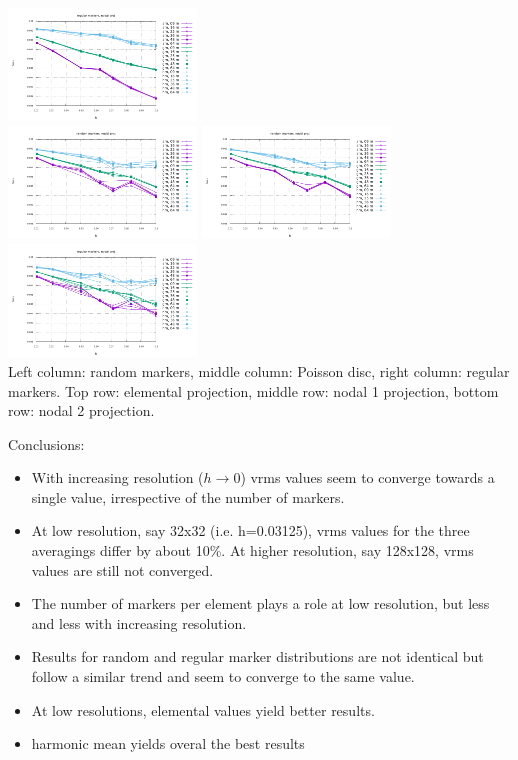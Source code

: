 \begin{center}
\includegraphics[width=5cm]{python_codes/fieldstone_13/vrms_reg_proj2}\\ 
\includegraphics[width=5cm]{python_codes/fieldstone_13/vrms_rand_proj3} 
\includegraphics[width=5cm]{python_codes/fieldstone_13/vrms_poissondisc_proj3} 
\includegraphics[width=5cm]{python_codes/fieldstone_13/vrms_reg_proj3}\\
{\small Left column: random markers, middle column: Poisson disc, right column: regular markers.
Top row: elemental projection, middle row: nodal 1 projection, bottom row: nodal 2 projection. }
\end{center}

Conclusions:
\begin{itemize}
\item
With increasing resolution ($h\rightarrow 0$) vrms values seem to converge towards a single value, irrespective 
of the number of markers. 

\item
At low resolution, say 32x32 (i.e. h=0.03125), vrms values for the three averagings differ by about 10\%. At higher resolution, say 128x128, vrms values are still not converged.  

\item
The number of markers per element plays a role at low resolution, but less and less with increasing resolution. 

\item
Results for random and regular marker distributions are not identical but follow a similar trend and seem to converge to 
the same value.

\item
At low resolutions, elemental values yield better results.

\item harmonic mean yields overal the best results
\end{itemize}

